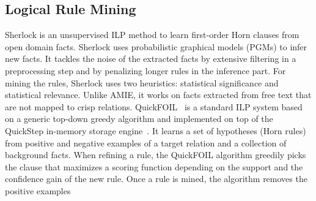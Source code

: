 \subsection{Logical Rule Mining}
Sherlock \cite{SchEtzWel10} is an unsupervised ILP method to learn first-order Horn clauses from open domain facts.
Sherlock uses probabilistic graphical models (PGMs) to infer new facts.
It tackles the noise of the extracted  facts by extensive filtering in a preprocessing step and by penalizing longer rules in the inference part.
For mining the rules, Sherlock uses two heuristics: statistical significance and statistical relevance. Unlike AMIE, it works on facts extracted from free text that are not mapped to crisp relations.
%
QuickFOIL~\cite{quickfoil} is a standard ILP system based on a generic top-down greedy algorithm and implemented
on top of  the QuickStep in-memory storage engine~\cite{Chasseur:2013:DES:2536258.2536260}. It learns a set of hypotheses (Horn rules)
from positive and negative examples of a target relation and a collection of background facts. When refining a rule, the QuickFOIL algorithm
greedily picks the clause that maximizes a scoring
function depending on the support and the confidence gain of the new rule. Once a rule is mined, the algorithm removes the positive examples
